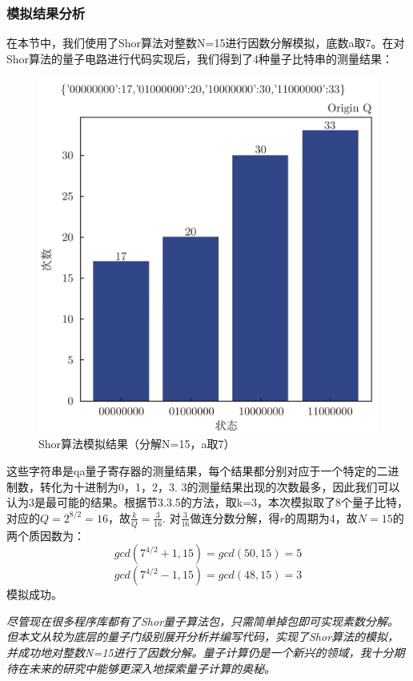 \documentclass[12pt,hyperref,a4paper,UTF8]{ctexart}
\begin{document}
\subsubsection{模拟结果分析}

在本节中，我们使用了Shor算法对整数N=15进行因数分解模拟，底数a取7。在对Shor算法的量子电路进行代码实现后，我们得到了4种量子比特串的测量结果：
\newpage

\begin{figure}[!htbp]     
    \centering     
    \includegraphics[width =0.7 \textwidth]{figures/结论.jpeg}     
    \caption{Shor算法模拟结果（分解N=15，a取7）}
\end{figure}

\noindent
这些字符串是qa量子寄存器的测量结果，每个结果都分别对应于一个特定的二进制数，转化为十进制为0，1，2，3.
3的测量结果出现的次数最多，因此我们可以认为3是最可能的结果。根据节3.3.5的方法，取k=3，本次模拟取了8个量子比特，对应的$Q=2^{8/2}=16$，故$\frac{k}{Q}=\frac{3}{16}$. 
对$\frac{3}{16}$做连分数分解，得$r$的周期为4，故$N=15$的两个质因数为：
$$
gcd(7^{4/2}+1, 15)=gcd(50, 15)=5
$$
$$
gcd(7^{4/2}-1, 15)=gcd(48, 15)=3
$$
模拟成功。

\vskip 50pt
\textit{尽管现在很多程序库都有了Shor量子算法包，只需简单掉包即可实现素数分解。但本文从较为底层的量子门级别展开分析并编写代码，实现了Shor算法的模拟，并成功地对整数N=15进行了因数分解。量子计算仍是一个新兴的领域，我十分期待在未来的研究中能够更深入地探索量子计算的奥秘。}
\end{document}
